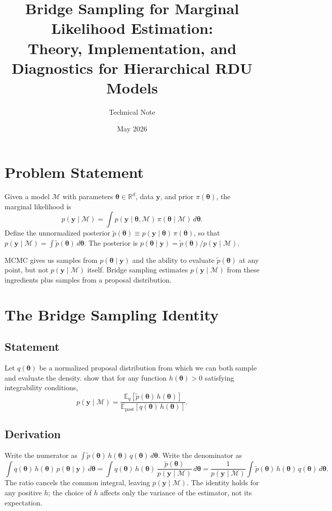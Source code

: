 \documentclass[11pt]{article}
\title{Bridge Sampling for Marginal Likelihood Estimation:\\
Theory, Implementation, and Diagnostics for Hierarchical RDU Models}
\author{Technical Note}
\date{May 2026}
\newcommand{\E}{\mathbb{E}}
\newcommand{\R}{\mathbb{R}}
\newcommand{\bth}{\boldsymbol{\theta}}
\newcommand{\by}{\mathbf{y}}
\newcommand{\cM}{\mathcal{M}}
\newcommand{\ptilde}{\tilde{p}}
\theoremstyle{plain}
\theoremstyle{definition}
\begin{document}
\maketitle

\tableofcontents
\newpage

\section{Problem Statement}

Given a model $\cM$ with parameters $\bth \in \R^d$, data $\by$, and prior
$\pi(\bth)$, the marginal likelihood is
\begin{equation}
  \label{eq:ml}
  p(\by \mid \cM) = \int p(\by \mid \bth, \cM)\, \pi(\bth \mid \cM)\, d\bth.
\end{equation}
Define the unnormalized posterior
$\ptilde(\bth) \equiv p(\by \mid \bth)\, \pi(\bth)$, so that
$p(\by \mid \cM) = \int \ptilde(\bth)\, d\bth$. The posterior is
$p(\bth \mid \by) = \ptilde(\bth) / p(\by \mid \cM)$.

MCMC gives us samples from $p(\bth \mid \by)$ and the ability to evaluate
$\ptilde(\bth)$ at any point, but not $p(\by \mid \cM)$ itself. Bridge
sampling estimates $p(\by \mid \cM)$ from these ingredients plus samples from
a proposal distribution.


\section{The Bridge Sampling Identity}

\subsection{Statement}

Let $q(\bth)$ be a normalized proposal distribution from which we can both
sample and evaluate the density. \citet{MengWong1996} show that for any
function $h(\bth) > 0$ satisfying integrability conditions,
\begin{equation}
  \label{eq:bridge_identity}
  p(\by \mid \cM)
  = \frac{\E_q\!\left[\ptilde(\bth)\, h(\bth)\right]}
         {\E_{\text{post}}\!\left[q(\bth)\, h(\bth)\right]}.
\end{equation}

\subsection{Derivation}

Write the numerator as
$\int \ptilde(\bth)\, h(\bth)\, q(\bth)\, d\bth$. Write the denominator as
\[
  \int q(\bth)\, h(\bth)\, p(\bth \mid \by)\, d\bth
  = \int q(\bth)\, h(\bth)\, \frac{\ptilde(\bth)}{p(\by \mid \cM)}\, d\bth
  = \frac{1}{p(\by \mid \cM)} \int \ptilde(\bth)\, h(\bth)\, q(\bth)\, d\bth.
\]
The ratio cancels the common integral, leaving $p(\by \mid \cM)$. The identity
holds for any positive $h$; the choice of $h$ affects only the variance of the
estimator, not its expectation.
\end{document}

